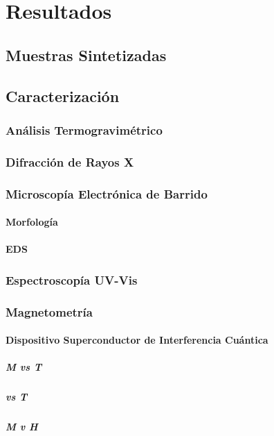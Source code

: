 \documentclass[../main.tex]{subfiles}
\begin{document}
\chapter{Resultados}

\section{Muestras Sintetizadas}

\section{Caracterización}

\subsection{Análisis Termogravimétrico}

\subsection{Difracción de Rayos X}

\subsection{Microscopía Electrónica de Barrido}

\subsubsection{Morfología}

\subsubsection{EDS}

\subsection{Espectroscopía UV-Vis}

\subsection{Magnetometría}

\subsubsection{Dispositivo Superconductor de Interferencia Cuántica}

\paragraph{M vs T}

\paragraph{\textchi{} vs T}

\paragraph{M v H}
\end{document}
